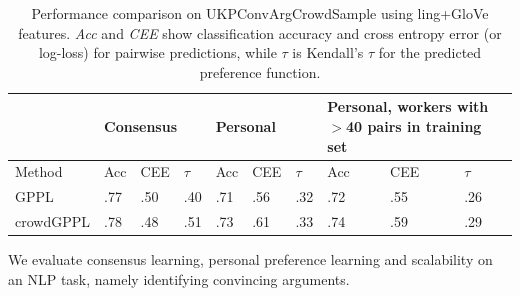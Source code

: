\begin{table}
\small
\begin{tabularx}{\columnwidth}{ | l | X | X | X | X | X | X | X | X | X |}
\hline
 & \multicolumn{3}{l|}{Consensus}&\multicolumn{3}{l|}{Personal} &\multicolumn{3}{p{3.1cm}|}{Personal, workers with $>$40 pairs in training set} \\ \hline
 Method & Acc & CEE & $\tau$ & Acc & CEE & $\tau$ & Acc & CEE & $\tau$ \\ \hline
 GPPL %
  & .77 & .50 & .40 & .71 & .56 & .32 & .72 & .55 & .26 \\ %
 crowdGPPL %
 & .78 & .48 & .51 & .73 & .61 & .33 & .74 & .59 & .29  %
 \\\hline
\end{tabularx}
\caption{Performance comparison on UKPConvArgCrowdSample using ling+GloVe features. \emph{Acc} and \emph{CEE} show classification accuracy and cross entropy error (or log-loss) for pairwise predictions, 
while $\tau$ is Kendall's $\tau$ for the predicted preference function. }
\label{tab:convarg}
\end{table}
We evaluate consensus learning, personal preference learning and scalability
on an NLP task, namely identifying convincing arguments. 
